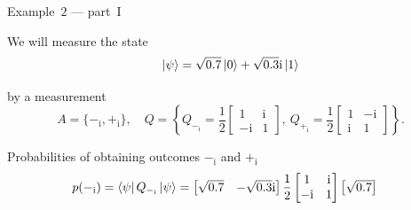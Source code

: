         \begin{frame}{Example~$2$ --- part~I}
            \small
            \begin{block}{We will measure the state}
                $$\ket\psi = \sqrt{0.7} \ket{0} + \sqrt{0.3} \mathrm{i}\ket{1} $$
            \end{block}
            \begin{block}{by a measurement}
                \begin{equation*}
                    A = \{-_\mathrm{i}, +_\mathrm{i}\}, \quad  Q = \left\{Q_{-_\mathrm{i}}  = 
                    \frac{1}{2}
                    \begin{bmatrix}
                        1 & \mathrm{i}\\
                        -\mathrm{i} & 1
                    \end{bmatrix}, \  
                    Q_{+_\mathrm{i}} =  \frac{1}{2}
                    \begin{bmatrix}
                        1 & -\mathrm{i}\\
                        \mathrm{i} & 1
                    \end{bmatrix}\right\}.
                \end{equation*}
            \end{block}
            \begin{block}{Probabilities of obtaining outcomes $-_\mathrm{i}$ and 
                $+_\mathrm{i}$}
                \begin{equation*}
                    \begin{split}
                        p(-_\mathrm{i}) &= \bra{\psi} Q_{-_\mathrm{i}} \ket{\psi} = 
                        \begin{bmatrix}
                            \sqrt{0.7} & -\sqrt{0.3}\mathrm{i}
                        \end{bmatrix}
                        \frac{1}{2}
                        \begin{bmatrix}
                            1 & \mathrm{i}\\
                            -\mathrm{i} & 1
                        \end{bmatrix}
                        \begin{bmatrix}
                            \sqrt{0.7} \\

\end{bmatrix}
\end{split}
\end{equation*}
\end{block}
\end{frame}
